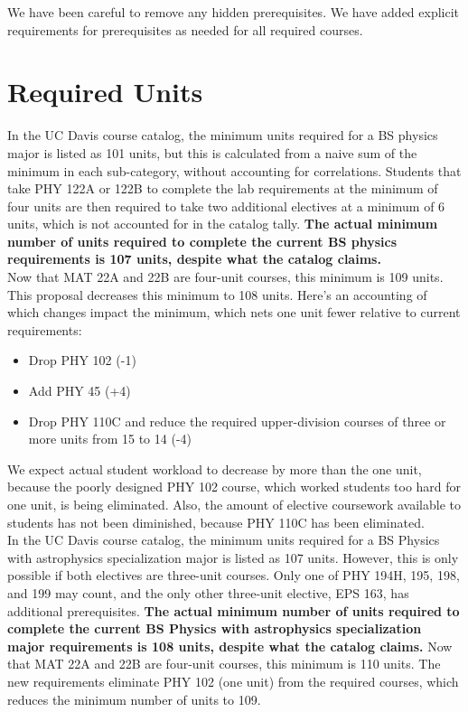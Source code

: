 \documentclass[12pt]{article}
\begin{document}
\noindent
We have been careful to remove any hidden prerequisites.  We have added explicit requirements
for prerequisites as needed for all required courses.\\

\section*{Required Units}

In the UC Davis course catalog, the minimum units required for a BS
physics major is listed as 101 units, but this is calculated from a
naive sum of the minimum in each sub-category, without accounting for
correlations.  Students that take PHY 122A or 122B to complete the lab
requirements at the minimum of four units are then required to take
two additional electives at a minimum of 6 units, which is not
accounted for in the catalog tally.  {\bf The actual minimum number of
  units required to complete the current BS physics requirements is
  107 units, despite what the catalog claims.} \\[5pt]

\noindent
Now that MAT 22A and 22B are four-unit courses, this minimum is 109
units.\\[5pt]

\noindent
This proposal decreases this minimum to 108 units.  Here's an
accounting of which changes impact the minimum, which nets one unit
fewer relative to current requirements:
\begin{itemize}
\item Drop PHY 102 (-1)
\item Add PHY 45 (+4)
\item Drop PHY 110C and reduce the required upper-division courses of three or more units from 15 to 14 (-4)
\end{itemize}
We expect actual student workload to decrease by more than the one
unit, because the poorly designed PHY 102 course, which worked
students too hard for one unit, is being eliminated.  Also, the
amount of elective coursework available to students has not been
diminished, because PHY 110C has been eliminated.\\[5pt]

\noindent
In the UC Davis course catalog, the minimum units required for a BS
Physics with astrophysics specialization major is listed as 107 units.
However, this is only possible if both electives are three-unit
courses.  Only one of PHY 194H, 195, 198, and 199 may count, and the
only other three-unit elective, EPS 163, has additional
prerequisites.  {\bf The actual minimum number of units required to
  complete the current BS Physics with astrophysics specialization
  major requirements is 108 units, despite what the catalog claims.}
Now that MAT 22A and 22B are four-unit courses, this minimum is 110
units.  The new requirements eliminate PHY 102 (one unit) from the
required courses, which reduces the minimum number of units to
109.\\[5pt]
\end{document}
